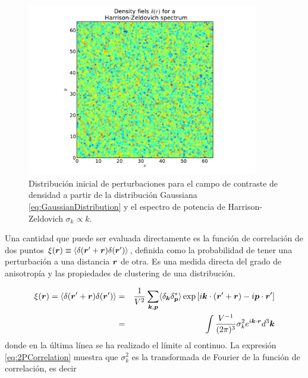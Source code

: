 \begin{figure}[htbp]
	\centering
	\includegraphics[width=0.9\textwidth]
	{./figures/2_theoretical_framework/Initial_Density.pdf}

	\caption{\small{Distribución inicial de perturbaciones para el campo
	de contraste de densidad a partir de la distribución Gaussiana 
	\ref{eq:GaussianDistribution} y el espectro de potencia de Harrison-
	Zeldovich $\sigma_k \propto k$.}}
	
	\label{fig:InitialDensity}
\end{figure}


Una cantidad que puede ser evaluada directamente es la función de 
correlación de dos puntos $\xi(\boldsymbol{ r }) \equiv \langle \delta(\boldsymbol{ r }' + \boldsymbol{ r })
\delta(\boldsymbol{ r }') \rangle$, definida como la probabilidad de tener una 
perturbación a una distancia $\boldsymbol{ r }$ de otra. Es una medida directa del 
grado de anisotropía y las propiedades de clustering de una distribución.


\begin{eqnarray}
\nonumber
\xi(\boldsymbol{ r }) = \langle \delta(\boldsymbol{ r }' + \boldsymbol{ r }) \delta(\boldsymbol{ r }') \rangle &=& 
\frac{1}{V^2}\sum_{\boldsymbol{ k }, \boldsymbol{ p }} \langle \delta_{\boldsymbol{ k }} \delta_{\boldsymbol{ p }}^*\rangle
\exp\left[  i\boldsymbol{ k } \cdot(\boldsymbol{ r }' + \boldsymbol{ r })- i\boldsymbol{ p } \cdot \boldsymbol{ r }'  \right] \\
\label{eq:2PCorrelation}
&=& \int \frac{V^{-1}}{(2\pi)^3}\sigma_k^2 e^{i \boldsymbol{ k } \cdot \boldsymbol{ r }} d^3 \boldsymbol{ k }
\end{eqnarray}
donde en la última línea se ha realizado el límite al continuo. La 
expresión \ref{eq:2PCorrelation} muestra que $\sigma_k^2$ es la 
transformada de Fourier de la función de correlación, es decir


